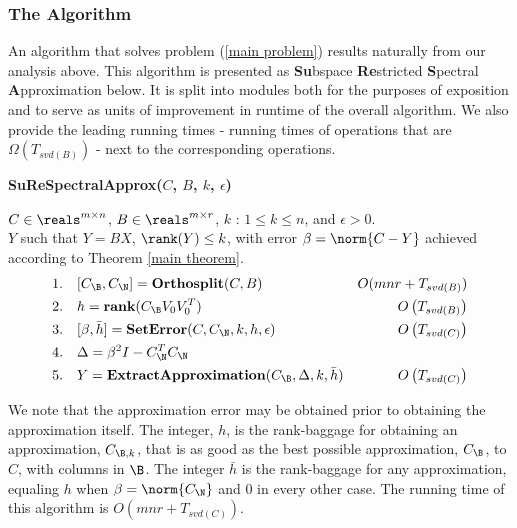 \subsubsection{The Algorithm}
An algorithm that solves problem (\ref{main problem}) results naturally from our analysis above. This algorithm is presented as \textbf{Su}bspace \textbf{Re}stricted \textbf{S}pectral \textbf{A}pproximation below. It is split into modules both for the purposes of exposition and to serve as units of improvement in runtime of the overall algorithm. We also provide the leading running times - running times of operations that are $\Omega(T_{svd(B)})$ - next to the corresponding operations.
\begin{framed}
\begin{alg}\label{alg:outline}
{\bf SuReSpectralApprox($C$, $B$, $k$, $\epsilon$) }
\end{alg}
 $C \in \reals^{m \times n}$, $B \in \reals^{m \times r}$, $k$ : $1 \leq k \leq n$, and $\epsilon > 0$.\\
 $Y$ such that $Y=BX$, $\rank(Y) \leq k$, with error $\beta = \norm{C - Y}$ achieved according to Theorem \ref{main theorem}.
%
\begin{align*}
1. \quad& [C_{\B}, C_{\N}] = \textbf{Orthosplit}(C, B) & O(mnr + T_{svd(B)})\\
2. \quad& h = \textbf{rank}(C_{\B} V_0 V_0 ^T)  & O\left(T_{svd(B)} \right)\\
3. \quad& [\beta,\bar h] = \textbf{SetError}(C, C_{\N}, k, h, \epsilon) & O\left( T_{svd(C)} \right) \\
4. \quad& \Delta = \beta^2 I - C_{\N} ^T C_{\N} & \\
5. \quad& Y = \textbf{ExtractApproximation}(C_{\B}, \Delta, k, \bar h) & O\left( T_{svd(C)} \right) \\
\end{align*}
%
\end{framed}

\noindent We note that the approximation error may be obtained prior to obtaining the approximation itself. The integer, $h$, is the rank-baggage for obtaining an approximation, $C_{\B, k}$, that is as good as the best possible approximation, $C_{\B}$, to $C$, with columns in $\B$. The integer $\bar{h}$ is the rank-baggage for any approximation, equaling $h$ when $\beta = \norm{C_{\N}}$ and 0 in every other case. The running time of this algorithm is $O\left( mnr + T_{svd(C)} \right)$.


